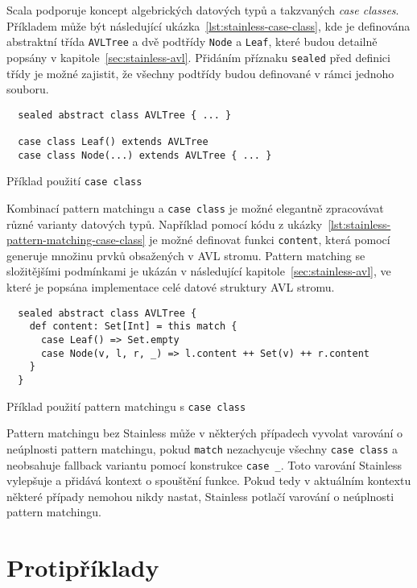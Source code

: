 Scala podporuje koncept algebrických datových typů
a takzvaných \textit{case classes}.
Příkladem může být následující ukázka~\ref{lst:stainless-case-class},
kde je definována abstraktní třída \texttt{AVLTree} a dvě podtřídy \texttt{Node} a \texttt{Leaf},
které budou detailně popsány v kapitole~\ref{sec:stainless-avl}.
Přidáním příznaku \texttt{sealed} před definici třídy
je možné zajistit, že všechny podtřídy budou definované v rámci jednoho souboru.

\begin{listing}[H]
  \begin{verbatim}
  sealed abstract class AVLTree { ... }

  case class Leaf() extends AVLTree
  case class Node(...) extends AVLTree { ... }
  \end{verbatim}
  \caption{Příklad použití \texttt{case class}}
  \label{lst:stainless-case-class}
\end{listing}

Kombinací pattern matchingu a \texttt{case class} je možné elegantně zpracovávat různé varianty datových typů.
Například pomocí kódu z ukázky~\ref{lst:stainless-pattern-matching-case-class}
je možné definovat funkci \texttt{content},
která pomocí generuje množinu prvků obsažených v AVL stromu.
Pattern matching se složitějšími podmínkami je ukázán v následující kapitole~\ref{sec:stainless-avl},
ve které je popsána implementace celé datové struktury AVL stromu.

\begin{listing}[H]
  \begin{verbatim}
  sealed abstract class AVLTree {
    def content: Set[Int] = this match {
      case Leaf() => Set.empty
      case Node(v, l, r, _) => l.content ++ Set(v) ++ r.content
    }
  }
  \end{verbatim}
  \caption{Příklad použití pattern matchingu s \texttt{case class}}
  \label{lst:stainless-pattern-matching-case-class}
\end{listing}

Pattern matchingu bez Stainless může v některých případech vyvolat
varování o neúplnosti pattern matchingu, pokud \texttt{match} nezachycuje všechny \texttt{case class}
a neobsahuje fallback variantu pomocí konstrukce \texttt{case \_}.
Toto varování Stainless vylepšuje a přidává kontext o spouštění funkce.
Pokud tedy v aktuálním kontextu některé případy nemohou nikdy nastat,
Stainless potlačí varování o neúplnosti pattern matchingu.

\section{Protipříklady}
\label{sec:stainless-counterexamples}

